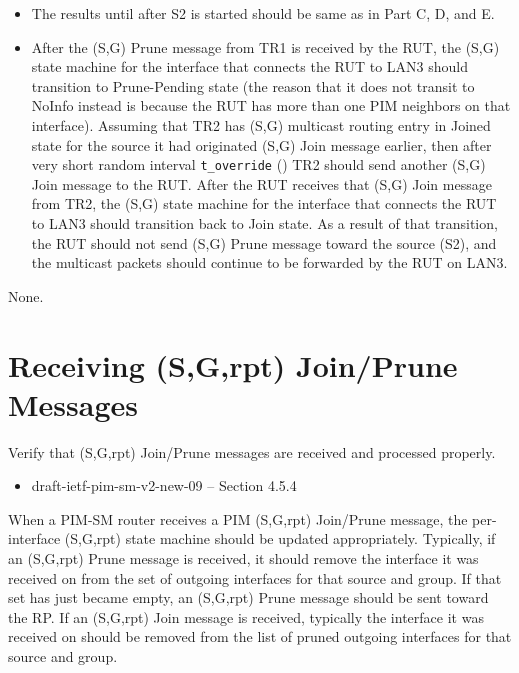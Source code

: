 \documentclass[11pt]{report}
\begin{document}

\begin{itemize}

  \item The results until after S2 is started should be same as in
  Part C, D, and E.

  \item After the (S,G) Prune message from TR1 is received by the RUT,
  the (S,G) state machine for the interface that connects the RUT to
  LAN3 should transition to Prune-Pending state (the reason that it does
  not transit to NoInfo instead is because the RUT has more than one PIM
  neighbors on that interface).
  Assuming that TR2 has (S,G) multicast routing entry in Joined state
  for the source it had originated (S,G) Join message earlier, then after
  very short random interval \verb=t_override= ({\PimsmTOverride}) TR2
  should send another (S,G) Join message to the RUT.
  After the RUT receives that (S,G) Join message from TR2,
  the (S,G) state machine for the interface that connects the RUT to
  LAN3 should transition back to Join state.
  As a result of that transition, the RUT should not send (S,G) Prune
  message toward the source (S2), and the multicast packets should continue
  to be forwarded by the RUT on LAN3.

\end{itemize}

None.

\newpage
\section{Receiving (S,G,rpt) Join/Prune Messages}

Verify that (S,G,rpt) Join/Prune messages are received and processed
properly.

\begin{itemize}
  \item draft-ietf-pim-sm-v2-new-09 -- Section 4.5.4
\end{itemize}

When a PIM-SM router receives a PIM (S,G,rpt) Join/Prune message, the
per-interface (S,G,rpt) state machine should be updated appropriately.
Typically, if an (S,G,rpt) Prune message is received, it should
remove the interface it was received on from the set of outgoing interfaces
for that source and group. If that set has just became empty, an (S,G,rpt)
Prune message should be sent toward the RP.
If an (S,G,rpt) Join message is received, typically the interface it was
received on should be removed from the list of pruned outgoing interfaces for
that source and group.
\end{document}
